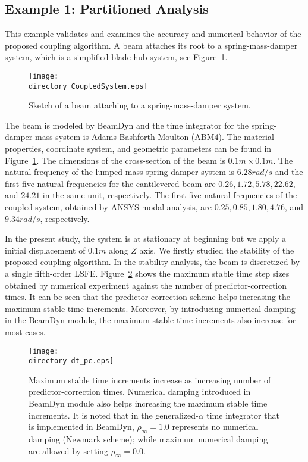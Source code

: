 \documentclass{aiaa-tc}
\def\directory{EPSF/}
\begin{document}
 \subsection{Example 1: Partitioned Analysis}
 This example validates and examines the accuracy and numerical behavior of the proposed coupling algorithm. A beam attaches its root to a spring-mass-damper system, which is a simplified blade-hub system, see Figure~\ref{fig:CoupledSystem}. 
 \begin{figure}
\centering
\texttt{[image: \\directory CoupledSystem.eps]}
\caption{Sketch of a beam attaching to a spring-mass-damper system.} 
\label{fig:CoupledSystem}
\end{figure}
 The beam is modeled by BeamDyn and the time integrator for the spring-damper-mass system is Adams-Bashforth-Moulton (ABM4). The material properties, coordinate system, and geometric parameters can be found in Figure~\ref{fig:CoupledSystem}. The dimensions of the cross-section of the beam is $0.1m \times 0.1m$. The natural frequency of the lumped-mass-spring-damper system is $6.28 rad/s$ and the first five natural frequencies for the cantilevered beam are $0.26, 1.72, 5.78, 22.62$, and $24.21$ in the same unit, respectively. The first five natural frequencies of the coupled system, obtained by ANSYS modal analysis, are $0.25, 0.85, 1.80, 4.76$, and $9.34 rad/s$, respectively.
 
 In the present study, the system is at stationary at beginning but we apply a initial displacement of $0.1m$ along $Z$ axis. We firstly studied the stability of the proposed coupling algorithm. In the stability analysis, the beam is discretized by a single fifth-order LSFE. Figure~\ref{fig:CoupledDTPC} shows the maximum stable time step sizes obtained by numerical experiment against the number of predictor-correction times. It can be seen that the predictor-correction scheme helps increasing the maximum stable time increments. Moreover, by introducing numerical damping in the BeamDyn module, the maximum stable time increments also increase for most cases.
 \begin{figure}
\centering
\texttt{[image: \\directory dt\_pc.eps]}
\caption{Maximum stable time increments increase as increasing number of predictor-correction times. Numerical damping introduced in BeamDyn module also helps increasing the maximum stable time increments. It is noted that in the generalized-$\alpha$ time integrator that is implemented in BeamDyn, $\rho_\infty = 1.0$ represents no numerical damping (Newmark scheme); while maximum numerical damping are allowed by setting $\rho_\infty = 0.0$. } 
\label{fig:CoupledDTPC}
\end{figure}
 
\end{document}
